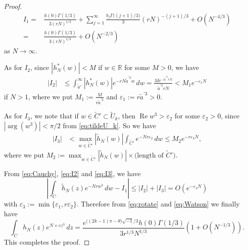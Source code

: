 \documentclass[a4paper,dvipdfmx]{amsart}
\theoremstyle{plain}
\theoremstyle{definition}
\theoremstyle{remark}
\newcommand{\R}{\mathbb{R}}
\renewcommand{\Re}{\operatorname{Re}}
\renewcommand{\i}{\sqrt{-1}}
\numberwithin{equation}{section}
\begin{document}
\begin{proof}
\begin{equation}
\begin{split}
  I_1
  =&
  \frac{h(0)\Gamma(1/3)}{3(rN)^{1/3}}
  +
  \sum_{j=1}^{\infty}\frac{b_{j}\Gamma\bigl((j+1)/3\bigr)}{3}(rN)^{-(j+1)/3}
  +
  O(N^{-4/3})
  \\
  =&
  \frac{h(0)\Gamma(1/3)}{3(rN)^{1/3}}
  +
  O(N^{-2/3})
\end{split}
\end{equation}
as $N\to\infty$.
\par
As for $I_2$, since $|h_N^{\ast}(w)|<M$ if $w\in\R$ for some $M>0$, we have
\begin{equation}\label{eq:I2}
\begin{split}
  \left|I_2\right|
  &\le
  \int_{\tilde{a}'}^{\infty}\left|h_N^{\ast}(w)\right|e^{-rN\tilde{a}^{\prime2}w}\,dw
  =
  \frac{Me^{-{\tilde{a}^{\prime3}rN}}}{\tilde{a}^{\prime2}rN}
  <
  M_1e^{-\varepsilon_1N}
\end{split}
\end{equation}
if $N>1$, where we put $M_1:=\frac{M}{r\tilde{a}^{\prime2}}$ and $\varepsilon_1:=r\tilde{a}^{\prime3}>0$.
\par
As for $I_3$, we note that if $w\in\tilde{C}'\subset\tilde{U}_{k}$, then $\Re{w^3}>\varepsilon_2$ for some $\varepsilon_2>0$, since $\left|\arg\left(w^3\right)\right|<\pi/2$ from \eqref{eq:tildeU_k}.
So we have
\begin{equation}\label{eq:I3}
\begin{split}
  \left|I_3\right|
  &<
  \max_{w\in\tilde{C}'}\left|\tilde{h}_N(w)\right|
  \int_{\tilde{C}'}e^{-Nr\varepsilon_2}\,dw
  \le
  M_2e^{-r\varepsilon_2N},
\end{split}
\end{equation}
where we put $M_2:=\max_{w\in\tilde{C}'}\left|\tilde{h}_N(w)\right|\times\text{(length of $\tilde{C}'$)}$.
\par
From \eqref{eq:Cauchy}, \eqref{eq:I2} and \eqref{eq:I3}, we have
\begin{equation*}
  \left|
    \int_{\tilde{C}}\tilde{h}_N(z)e^{-Nrw^3}\,dw
    -
    I_1
  \right|
  \le
  \left|I_2\right|+\left|I_3\right|
  =
  O(e^{-\varepsilon_3N})
\end{equation*}
with $\varepsilon_3:=\min\{\varepsilon_1,r\varepsilon_2\}$.
Therefore from \eqref{eq:rotate} and \eqref{eq:Watson} we finally have
\begin{equation*}
  \int_{C}h_N(z)e^{N\times cz^3}\,dz
  =
  \frac{e^{\bigl((2k-1)\pi-\theta\bigr)\i/3}h(0)\Gamma(1/3)}{3r^{1/3}N^{1/3}}
  \left(1+O(N^{-1/3})\right).
\end{equation*}
This completes the proof.
\end{proof}
\end{document}
